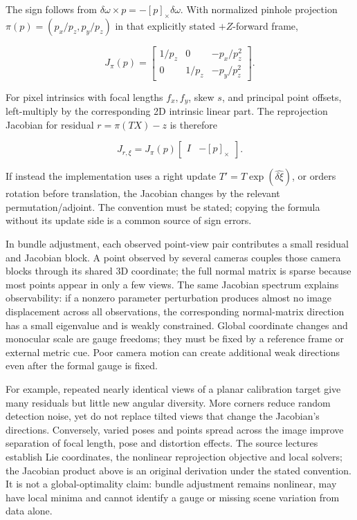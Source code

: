 The sign follows from \(\delta\omega\times p=-[p]_\times\delta\omega\). With normalized pinhole projection \(\pi(p)=(p_x/p_z,p_y/p_z)\) in that explicitly stated \(+Z\)-forward frame,

\[
J_\pi(p)=
\begin{bmatrix}
1/p_z&0&-p_x/p_z^2\\
0&1/p_z&-p_y/p_z^2
\end{bmatrix}.
\]

For pixel intrinsics with focal lengths \(f_x,f_y\), skew \(s\), and principal point offsets, left-multiply by the corresponding 2D intrinsic linear part. The reprojection Jacobian for residual \(r=\pi(TX)-z\) is therefore

\[
J_{r,\xi}=J_\pi(p)\begin{bmatrix}I&-[p]_\times\end{bmatrix}.
\]

If instead the implementation uses a right update \(T'=T\exp(\widehat{\delta\xi})\), or orders rotation before translation, the Jacobian changes by the relevant permutation/adjoint. The convention must be stated; copying the formula without its update side is a common source of sign errors.

In bundle adjustment, each observed point-view pair contributes a small residual and Jacobian block. A point observed by several cameras couples those camera blocks through its shared 3D coordinate; the full normal matrix is sparse because most points appear in only a few views. The same Jacobian spectrum explains observability: if a nonzero parameter perturbation produces almost no image displacement across all observations, the corresponding normal-matrix direction has a small eigenvalue and is weakly constrained. Global coordinate changes and monocular scale are gauge freedoms; they must be fixed by a reference frame or external metric cue. Poor camera motion can create additional weak directions even after the formal gauge is fixed.

For example, repeated nearly identical views of a planar calibration target give many residuals but little new angular diversity. More corners reduce random detection noise, yet do not replace tilted views that change the Jacobian's directions. Conversely, varied poses and points spread across the image improve separation of focal length, pose and distortion effects. The source lectures establish Lie coordinates, the nonlinear reprojection objective and local solvers; the Jacobian product above is an original derivation under the stated convention. It is not a global-optimality claim: bundle adjustment remains nonlinear, may have local minima and cannot identify a gauge or missing scene variation from data alone.

